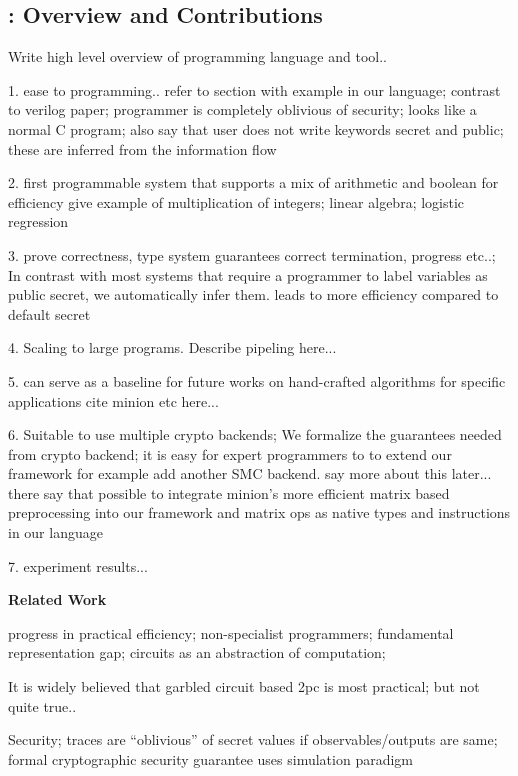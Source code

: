 \subsection{\tool: Overview and Contributions} Write high level overview of programming language and tool..

1. ease to programming.. refer to section with example in our language; contrast to verilog paper; programmer is completely oblivious of security; looks like a normal C program;
also say that user does not write keywords secret and public; these are inferred from the information flow

2. first programmable system that supports a mix of arithmetic and boolean for efficiency give example of multiplication of integers; linear algebra; logistic regression

3. prove correctness, type system guarantees correct termination, progress etc..; In contrast with most systems that require a programmer to label variables as public secret, we automatically infer them. leads to more efficiency compared to default secret

4. Scaling to large programs. Describe pipeling here...

5. can serve as a baseline for future works on hand-crafted algorithms for specific applications cite minion etc here...

6. Suitable to use multiple crypto backends; We formalize the guarantees needed from crypto backend; it is easy for expert programmers to to extend our framework for example add another SMC backend. say more about this later... there say that possible to integrate minion's more efficient matrix based preprocessing into our framework and matrix ops as native types and instructions in our language

7. experiment results...



\noindent\textbf{Related Work}
\cite{lambdaps,wysteria}

 progress in practical efficiency; non-specialist programmers; fundamental representation gap; circuits as an abstraction of computation; 

 It is widely believed that garbled circuit based 2pc is most practical; but not quite true..

 Security; traces are ``oblivious'' of secret values if observables/outputs are same; formal cryptographic security guarantee uses simulation paradigm \cite{canetti2000} 


